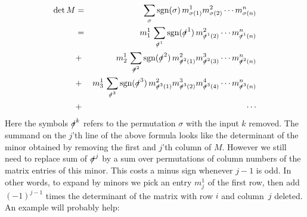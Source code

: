 \begin{eqnarray*}
\det M &=& \sum_{\sigma} \text{sgn}(\sigma)\, m^1_{\sigma(1)}m^2_{\sigma(2)}\cdots m^n_{\sigma(n)} \\
&=& m^1_1\, \sum_{\slashed{\sigma}^1} \text{sgn}(\slashed{\sigma}^1)\, m^2_{\slashed{\sigma}^1(2)}\cdots m^n_{\slashed{\sigma}^1(n)} \\
& +&  m^1_2\, \sum_{\slashed{\sigma}^2} \text{sgn}(\slashed{\sigma}^2)\, m^2_{\slashed{\sigma}^2(1)}
m^3_{\slashed{\sigma}^2(3)}\cdots m^n_{\slashed{\sigma}^2(n)} \\
& +&  m^1_3\,  \sum_{\slashed{\sigma}^3} \text{sgn}(\slashed{\sigma}^3)\, m^2_{\slashed{\sigma}^3(1)}m^3_{\slashed{\sigma}^3(2)}m^4_{\slashed{\sigma}^3(4)}\cdots m^n_{\slashed{\sigma}^3(n)}\\ &+& \cdots
\end{eqnarray*}
Here the symbols $\slashed{\sigma}^k$ 
refers to the permutation $\sigma$ with the input $k$ removed.
The summand on  the $j$'th line of the above formula looks like the determinant of the minor obtained by removing the first  and $j$'th column of $M$. However we still need to  replace sum of $\slashed{\sigma}^j$ by a sum over permutations of  column numbers of the matrix entries of this minor. This costs a minus sign whenever $j-1$ is odd.
In other words, to expand by minors we pick an entry $m^1_j$ of the first row, then add $(-1)^{j-1}$ times the determinant of the matrix with row $i$ and column~$j$ deleted. An example will probably help:

